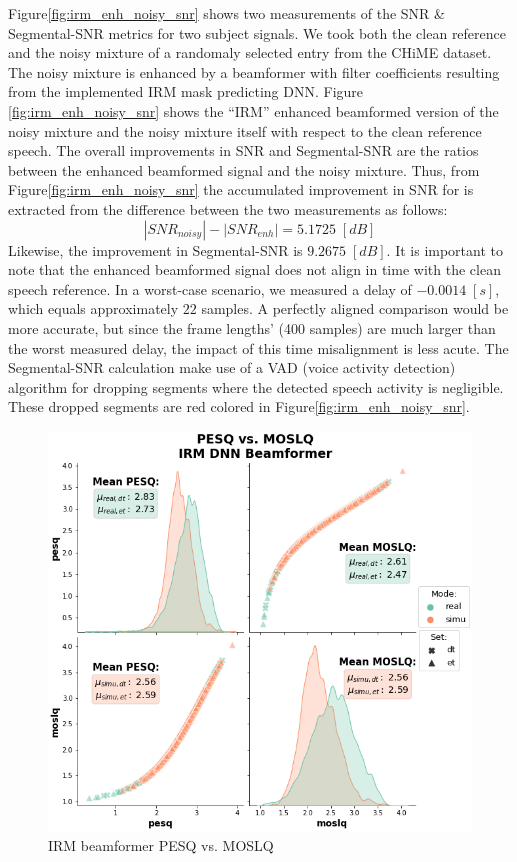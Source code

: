 Figure\;\ref{fig:irm_enh_noisy_snr} shows two measurements of the SNR \&
Segmental-SNR metrics for two subject signals.
We took both the 
clean reference and the noisy mixture of a randomaly
selected entry from the CHiME dataset.
The noisy mixture is enhanced by a beamformer with filter coefficients
resulting from the implemented IRM mask predicting DNN. 
Figure \;\ref{fig:irm_enh_noisy_snr} shows the 
``IRM'' enhanced beamformed
version of the noisy mixture and the noisy mixture itself
with respect to the clean reference speech.
The overall improvements in SNR and Segmental-SNR 
are the ratios between the enhanced beamformed signal
and the noisy mixture. Thus, from Figure\;\ref{fig:irm_enh_noisy_snr}
the accumulated improvement in SNR for is extracted from the difference between
the two measurements as follows:
\[|SNR_{noisy}| - |SNR_{enh}| = 5.1725\;[dB]\]
Likewise, the improvement in Segmental-SNR is \(9.2675\;[dB]\).
It is important to note that the enhanced beamformed signal
does not align in time with the clean speech reference. 
In a worst-case scenario, we measured a delay of \(-0.0014\;[s]\),
which equals approximately \(22\) samples. 
A perfectly aligned comparison would be more 
accurate, but since the frame lengths' (400 samples)
are much larger than the worst measured delay, 
the impact of this time misalignment is less acute.
The Segmental-SNR calculation make use of 
a VAD (voice activity detection) algorithm 
for dropping segments where the detected speech activity is negligible.
These dropped segments are red colored in Figure\;\ref{fig:irm_enh_noisy_snr}.

\begin{figure}[H]
    \centering
    \includegraphics[width=\linewidth]{Experiments/images/irm_pesq_mosq}
    \caption{IRM beamformer PESQ vs. MOSLQ}\label{fig:irm_pesq_mosq}
\end{figure}

